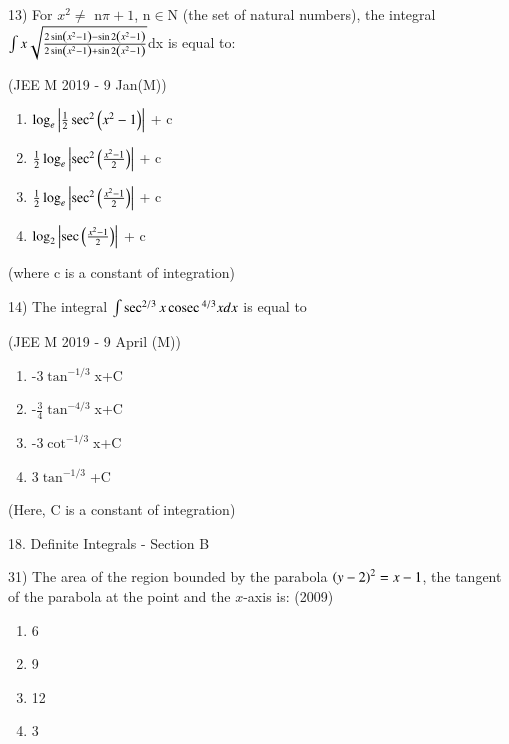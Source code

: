 \documentclass[journal,12pt,twocolumn]{IEEEtran}
\theoremstyle{remark}
\begin{document}
13)
	 For $x^2\neq$ n$\pi+1$, n$\in$N (the set of natural numbers), the integral $\int x\sqrt{\frac{2\sin \left(x^2-1\right)-\sin 2\left(x^2-1\right)}{2\sin \left(x^2-1\right)+\sin 2\left(x^2-1\right)}}$dx is equal to:

		\hfill{(JEE M 2019 - 9 Jan(M))}

		\begin{multicols}{1}
			\begin{enumerate}[label=(\alph*)]
				\item $\log_e\left\vert\frac{1}{2}\sec ^2\left(x^2-1\right)\right\vert$ + c
				\item $\frac{1}{2}\log_e\left\vert\sec ^2\left(\frac{x^2-1}{2}\right)\right\vert$ + c
				\item $\frac{1}{2}\log_e\left\vert\sec ^2\left(\frac{x^2-1}{2}\right)\right\vert$ + c
				\item $\log_2\left\vert\sec \left(\frac{x^2-1}{2}\right)\right\vert$ + c
			\end{enumerate}
		\end{multicols}
		(where c is a constant of integration)

14)
	 The integral $\int \sec ^{2/3}x\,\text{cosec}\, ^{4/3}x dx$ is equal to

		\hfill{(JEE M 2019 - 9 April (M))}

		\begin{multicols}{2}
			\begin{enumerate}[label=(\alph*)]
				\item -3$\tan ^{-1/3}$x+C
				\item -$\frac{3}{4}\tan ^{-4/3}$x+C
				\item -3$\cot ^{-1/3}$x+C
				\item 3$\tan ^{-1/3}$+C
			\end{enumerate}
		\end{multicols}
		(Here, C is a constant of integration)

18. Definite Integrals - Section B

31)
	 The area of the region bounded by the parabola $\left(y-2\right)^2=x-1$, the tangent of the parabola at the point  and the $x$-axis is:
		\hfill{(2009)}

		\begin{multicols}{4}
			\begin{enumerate}[label=(\alph*)]
				\item 6
				\item 9
				\item 12
				\item 3
			\end{enumerate}
		\end{multicols}
\end{document}
